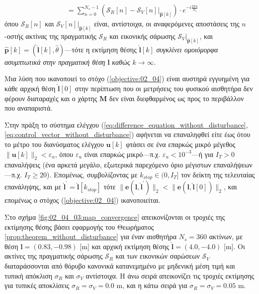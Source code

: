 \begin{bw_box}
\begin{theorem}
\begin{align}
      &= \sum\limits_{n=0}^{N_s-1}(\mathcal{S}_R[n] - \mathcal{S}_V[n]|_{\bm{\hat{p}}[k]}) \cdot e^{-i \frac{2 \pi n}{N_s}} \label{eq:X1}
  \end{align}
  όπου $\mathcal{S}_R[n]$ και $\mathcal{S}_V[n]|_{\bm{\hat{p}}[k]}$ είναι,
  αντίστοιχα, οι αναφερόμενες αποστάσεις της $n$-οστής ακτίνας της πραγματικής
  $\mathcal{S}_R$ και εικονικής σάρωσης $\mathcal{S}_V|_{\bm{\hat{p}}[k]}$, και
  $\hat{\bm{p}}[k] = (\hat{\bm{l}}[k], \hat{\theta})$---τότε η εκτίμηση θέσης
  $\hat{\bm{l}}[k]$ \textit{συγκλίνει ομοιόμορφα ασυμπτωτικά στην πραγματική
  θέση} $\bm{l}$ \textit{καθώς} $k \rightarrow \infty$.
\end{theorem}
\end{bw_box}

\begin{corollary}
  Μια λύση που ικανοποιεί το στόχο (\ref{objective:02_04}) είναι αυστηρά
  εγγυημένη για κάθε αρχική θέση $\hat{\bm{l}}[0]$ στην περίπτωση που οι
  μετρήσεις του φυσικού αισθητήρα δεν φέρουν διαταραχές και ο χάρτης $\bm{M}$
  δεν είναι διεφθαρμένος ως προς το περιβάλλον που αναπαριστά.
\end{corollary}

Στην πράξη το σύστημα ελέγχου
(\ref{eq:difference_equation_without_disturbance},
\ref{eq:control_vector_without_disturbance}) αφήνεται να επαναληφθεί είτε
έως ότου το μέτρο του διανύσματος ελέγχου $\bm{u}[k]$ φτάσει σε ένα επαρκώς
μικρό μέγεθος $\|\bm{u}[k]\|_2 < \varepsilon_u$, όπου $\varepsilon_u$ είναι
επαρκώς μικρό---π.χ. $\varepsilon_u < 10^{-3}$---ή για $I_T > 0$ επαναλήψεις
(ένα αρκετά μεγάλο, εξωτερικά παρεχόμενο όριο μέγιστων επαναλήψεων---π.χ. $I_T
\geq 20$). Επομένως, συμβολίζοντας με $k_{stop} \in (0, I_T]$ τον δείκτη
της τελευταίας επανάληψης, και με
$\hat{\bm{l}}^{\prime} = \hat{\bm{l}}[k_{stop}]$ τότε
$\|\bm{e}(\bm{l}, \hat{\bm{l}}^{\prime})\|_2 < \|\bm{e}(\bm{l}, \hat{\bm{l}}[0])\|_2$,
και επομένως ο στόχος (\ref{objective:02_04}) ικανοποιείται.

Στο σχήμα \ref{fig:02_04_03:map_convergence} απεικονίζονται οι τροχιές της
εκτίμησης θέσης βάσει εφαρμογής του Θεωρήματος
\ref{prop:theorem_without_disturbance} για έναν αισθητήρα $N_s = 360$ ακτίνων,
με θέση $\bm{l} = (0.83, -0.98)$ [m] και αρχική εκτίμηση θέσης $\hat{\bm{l}} =
(4.0,-4.0)$ [m]. Οι ακτίνες της πραγματικής σάρωσης $\mathcal{S}_R$ και των
εικονικών σαρώσεων $\mathcal{S}_V$ διαταράσσονται από θόρυβο κανονικά
κατανεμημένο με μηδενική μέση τιμή και τυπική απόκλιση $\sigma_R$ και
$\sigma_V$ αντίστοιχα. Η άνω σειρά απεικονίζει τις τροχιές εκτίμησης για
τυπικές αποκλίσεις $\sigma_R = \sigma_V = 0.0$ m, και η κάτω σειρά για
$\sigma_R = \sigma_V = 0.05$ m.

